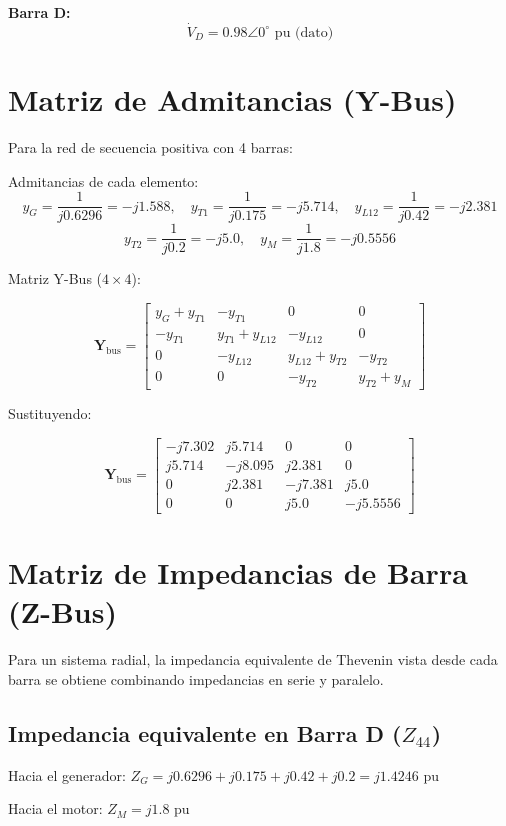 \documentclass[12pt,a4paper]{article}
\begin{document}
\textbf{Barra D:}
\[
\dot{V}_D = 0.98\angle0^\circ\text{ pu (dato)}
\]

\section{Matriz de Admitancias (Y-Bus)}

Para la red de secuencia positiva con 4 barras:

Admitancias de cada elemento:
\[
y_G = \frac{1}{j0.6296} = -j1.588,\quad
y_{T1} = \frac{1}{j0.175} = -j5.714,\quad
y_{L12} = \frac{1}{j0.42} = -j2.381
\]
\[
y_{T2} = \frac{1}{j0.2} = -j5.0,\quad
y_M = \frac{1}{j1.8} = -j0.5556
\]

Matriz Y-Bus ($4\times4$):

\[
\mathbf{Y}_{\text{bus}} = 
\begin{bmatrix}
y_G + y_{T1} & -y_{T1} & 0 & 0\\[4pt]
-y_{T1} & y_{T1} + y_{L12} & -y_{L12} & 0\\[4pt]
0 & -y_{L12} & y_{L12} + y_{T2} & -y_{T2}\\[4pt]
0 & 0 & -y_{T2} & y_{T2} + y_M
\end{bmatrix}
\]

Sustituyendo:

\[
\boxed{
\mathbf{Y}_{\text{bus}} = 
\begin{bmatrix}
-j7.302 & j5.714 & 0 & 0\\[4pt]
j5.714 & -j8.095 & j2.381 & 0\\[4pt]
0 & j2.381 & -j7.381 & j5.0\\[4pt]
0 & 0 & j5.0 & -j5.5556
\end{bmatrix}
}
\]

\section{Matriz de Impedancias de Barra (Z-Bus)}

Para un sistema radial, la impedancia equivalente de Thevenin vista desde cada barra se obtiene combinando impedancias en serie y paralelo.

\subsection{Impedancia equivalente en Barra D ($Z_{44}$)}

Hacia el generador: $Z_{G} = j0.6296 + j0.175 + j0.42 + j0.2 = j1.4246$ pu

Hacia el motor: $Z_{M} = j1.8$ pu
\end{document}
